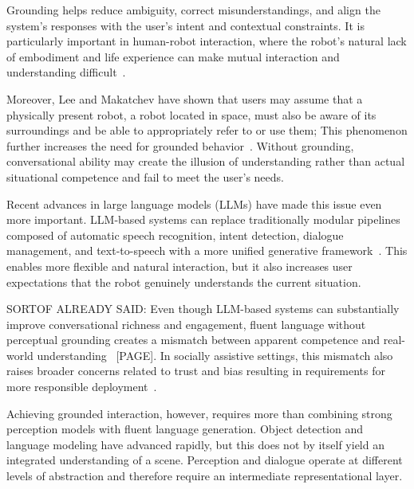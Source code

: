 Grounding helps reduce ambiguity, correct misunderstandings, and align the system's responses with the user's intent and contextual constraints. It is particularly important in human-robot interaction, where the robot's natural lack of embodiment and life experience can make mutual interaction and understanding difficult~\cite[611]{skantze-dogruoz-2023-open}.


Moreover, Lee and Makatchev have shown that users may assume that a physically present robot, a robot located in space, must also be aware of its surroundings and be able to appropriately refer to or use them; This phenomenon further increases the need for grounded behavior~\cite[3771]{makatchev}. Without grounding, conversational ability may create the illusion of understanding rather than actual situational competence and fail to meet the user's needs.

Recent advances in large language models (LLMs) have made this issue even more important. LLM-based systems can replace traditionally modular pipelines composed of automatic speech recognition, intent detection, dialogue management, and text-to-speech with a more unified generative framework~\cite{aturhurra_leveraging_2024}. This enables more flexible and natural interaction, but it also increases user expectations that the robot genuinely understands the current situation.

SORTOF ALREADY SAID: Even though LLM-based systems can substantially improve conversational richness and engagement, fluent language without perceptual grounding creates a mismatch between apparent competence and real-world understanding~\cite{kim_understanding_2024} [PAGE]. In socially assistive settings, this mismatch also raises broader concerns related to trust and bias resulting in requirements for more responsible deployment~\cite{aturhurra_leveraging_2024}.

Achieving grounded interaction, however, requires more than combining strong perception models with fluent language generation. Object detection and language modeling have advanced rapidly, but this does not by itself yield an integrated understanding of a scene. Perception and dialogue operate at different levels of abstraction and therefore require an intermediate representational layer.

